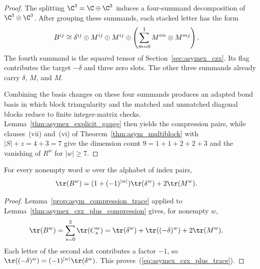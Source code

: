 \begin{proof}
    \leanok
    The splitting $\C^3=\C\oplus\C^2$ induces a four-summand
    decomposition of $\C^3\otimes\C^3$. After grouping these summands,
    each stacked letter has the form
    \begin{align}
        B^{ij} & \cong
        \delta^{ij}\oplus M^{ij}\oplus M^{ij}
        \oplus\left(\sum_{m=0}^1M^{im}\otimes M^{mj}\right).
        \notag
    \end{align}
    The fourth summand is the squared tensor of
    Section~\ref{sec:asymex_czx}. Its flag contributes the target
    $-\delta$ and three zero slots. The other three summands already
    carry $\delta$, $M$, and $M$.

    Combining the basis changes on these four summands produces an
    adapted bond basis in which block triangularity and the matched and
    unmatched diagonal blocks reduce to finite integer-matrix checks.
    Lemma~\ref{thm:asymex_explicit_gauge} then yields the compression
    pairs, while clauses~(vii) and~(vi) of
    Theorem~\ref{thm:asym_multiblock} with $|S|+z=4+3=7$ give the
    dimension count $9=1+1+2+2+3$ and the vanishing of $R^w$ for
    $|w|\geq7$.
\end{proof}

\begin{lemma}
    \label{thm:asymex_czx_plus_trace}
    \leanok
    For every nonempty word $w$ over the alphabet of index pairs,
    \begin{align}
        \tr(B^w) & =(1+(-1)^{|w|})\tr(\delta^w)+2\tr(M^w).
        \label{eq:asymex_czx_plus_trace}
    \end{align}
\end{lemma}

\begin{proof}
    \leanok
    Lemma~\ref{prop:asym_compression_trace} applied to
    Lemma~\ref{thm:asymex_czx_plus_compression} gives, for nonempty $w$,
    \begin{align}
        \tr(B^w)
         & =\sum_{s=0}^3\tr(C_s^w)
        =\tr(\delta^w)+\tr((-\delta)^w)+2\tr(M^w).
        \notag
    \end{align}
    Each letter of the second slot contributes a factor $-1$, so
    $\tr((-\delta)^w)=(-1)^{|w|}\tr(\delta^w)$.
    This proves~(\ref{eq:asymex_czx_plus_trace}).
\end{proof}

